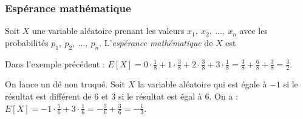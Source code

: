                         \subsubsection{Esp\'erance math\'ematique}
                              Soit $X$ une variable al\'eatoire prenant les valeurs 
                              $x_1,\ x_2,\ \ldots ,\ x_n$ avec les probabilit\'es 
                              $p_1,\ p_2,\ \ldots ,\ p_n$.
                              L'\emph{esp\'erance math\'ematique} de $X$ est
                              \par\smallskip\noindent
                              \par\smallskip
                              \begin{ex}
                                    Dans l'exemple pr\'ec\'edent :
                                    $E[X] =  0 \cdot \frac{1}{8}
                                           + 1 \cdot \frac{3}{8}
                                           + 2 \cdot \frac{3}{8}
                                           + 3 \cdot \frac{1}{8}
                                          = \frac{3}{8} + \frac{6}{8} + \frac{3}{8}
                                          = \frac{3}{2}.
                                    $
                              \end{ex}
                              \begin{ex}
                                    On lance un d\'e non truqu\'e.
                                    Soit $X$ la variable al\'eatoire qui est \'egale \`a $-1$
                                    si le r\'esultat est diff\'erent de $6$
                                    et $3$ si le r\'esultat est \'egal \`a $6$.
                                    On a :
                                    $E[X] = -1 \cdot \frac{5}{6} + 3 \cdot \frac{1}{6}
                                          = -\frac{5}{6} + \frac{3}{6}
                                          = -\frac{1}{3}.
                                    $
                              \end{ex}

